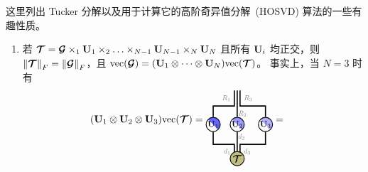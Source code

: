 \begin{remark}\label{rem:tuckers}
这里列出 Tucker 分解以及用于计算它的高阶奇异值分解~(HOSVD) 算法的一些有趣性质。
\begin{enumerate}

\item  若 $\Tt = \Gt\ttm{1}\Ub_1\ttm{2}\dots\ttm{N-1}\Ub_{N-1}\ttm{N}\Ub_N$ 且所有 $\mathbf{U}_i$ 均正交，则 $\left\lVert\bm{\mathcal{T}}\right\rVert_F = \left\lVert\bm{\mathcal{G}}\right\rVert_F$，且 $\mathrm{vec}(\bm{\mathcal{G}}) = (\mathbf{U}_1\otimes\cdots\otimes\mathbf{U}_N)\mathrm{vec}(\bm{\mathcal{T}})$。
事实上，当 $N=3$ 时有
\begin{align*}
(\Ub_1\kron\Ub_2\kron\Ub_3)\vectorize(\Tt) &= 
\begin{tikzpicture}[baseline=-0.5ex]
    \tikzset{tensor/.style = {minimum size = 0.5cm,shape = circle,thick,draw=black,inner sep = 0pt}, edge/.style = {thick,line width=.4mm},every loop/.style={}}
    \def\x{0}
    \def\y{0.5}   
    \node[tensor, path picture={
    \fill[fill=blue!60!white](path picture bounding box.south east)
        -- 
    (path picture bounding box.north west) --
    (path picture bounding box.north east) -- cycle;
    }, shift={(\x-0.85,\y-0.65)}] (U_1) {\scalebox{0.85}{$\Ub_1$}};
    \node[tensor, path picture={
    \fill[fill=blue!40!white](path picture bounding box.south east)
        -- 
    (path picture bounding box.north west) --
    (path picture bounding box.north east) -- cycle;
    }, shift={(\x,\y-0.65)}] (U_2) {\scalebox{0.85}{$\Ub_2$}};
    \node[tensor, path picture={
    \fill[fill=blue!30!white](path picture bounding box.south east)
        -- 
    (path picture bounding box.north west) --
    (path picture bounding box.north east) -- cycle;
    }, shift={(\x+1,\y-0.65)}] (U_3) {\scalebox{0.85}{$\Ub_3$}};
    \draw[edge] (U_1) -- (\x-0.85,\y-1.35) -- (\x-0.1,\y-1.35) -- (\x-0.1,\y-1.85) node [midway, left] {\scalebox{0.7}{\dimcolor{$d_1$}}};
    \draw[edge] (U_2) -- (\x,\y+0.55) node [very near start, right=-0.1cm] {\scalebox{0.7}{\dimcolor{$R_2$}}};
    \draw[edge] (U_3) -- (\x+1,\y-1.35) -- (\x+0.1,\y-1.35) -- (\x+0.1, \y-1.85) node [midway, right] {\scalebox{0.7}{\dimcolor{$d_3$}}};
    \draw[edge](U_1) -- (\x-0.85,\y) -- (\x-0.1,\y) -- (\x-0.1,\y+0.55)node [midway, left] {\scalebox{0.7}{\dimcolor{$R_1$}}};
    \draw[edge](U_3) -- (\x+1,\y) -- (\x+0.1,\y) -- (\x+0.1,\y+0.55)node [midway, right] {\scalebox{0.7}{\dimcolor{$R_3$}}};
    \node[tensor,fill=green!50!red!50!white](T) at (\x,\y-1.85) {$\Tt$};
    \draw[edge](U_2)--(T)node [near start, right=-0.1cm] {\scalebox{0.7}{\dimcolor{$d_2$}}};
\end{tikzpicture}
=
\begin{tikzpicture}[baseline=-0.5ex]

\end{tikzpicture}
\end{align*}
\end{enumerate}
\end{remark}
